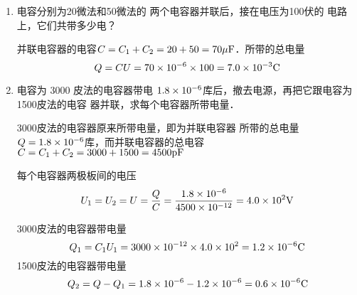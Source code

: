 \begin{enumerate}
\begin{figure}[htp]
    \caption{}
\end{figure}

\begin{proof}
    插入导体板后，相当于板间距离为$d_1$、$d_2$的两个平
    行板电容器串联。它们的电容分别为
    $C_1=\dfrac{S}{4\pi kd_1}$和 $C_2=\dfrac{S}{4\pi kd_2}$, 串联电容器的电容$C=\dfrac{C_1C_2}{C_1+C_2}$，将上式代入，得
    \[C=\frac{S}{4\pi k(d_1+d_2)}\]
    因为$d_1+d_2=\ell-d$, 所以$C=\dfrac{S}{4\pi k(\ell-d)}$.
\end{proof}

\item 电容分别为20微法和50微法的
两个电容器并联后，接在电压为100伏的
电路上，它们共带多少电？

\begin{solution}
    并联电容器的电容$C=C_1+C_2=20+50=
    70{\rm \mu F}$．所带的总电量
    \[Q=CU=70\times10^{-6}\times100=7.0\times  10^{-3}{\rm C}\]
\end{solution}

\item 电容为 3000 皮法的电容器带电
$1.8\times10^{-6}$库后，撤去电源，再把它跟电容为1500皮法的电容
器并联，求每个电容器所带电量．

\begin{solution}
    3000皮法的电容器原来所带电量，即为并联电容器
    所带的总电量$Q=1.8\times10^{-6}$库，而并联电容器的总电容$C=
    C_1+C_2=3000+1500=4500{\rm pF}$

    每个电容器两极板间的电压
    \[U_1=U_2=U=\frac{Q}{C}=\frac{1.8\times10^{-6}}{4500\times10^{-12}}=4.0\times 10^2{\rm V}\]
    
    3000皮法的电容器带电量
    \[Q_1=C_1U_1=3000\times10^{-12}\times4.0 \times10^2=1.2\times10^{-6}{\rm C}\]
    1500皮法的电容器带电量
    \[Q_2=Q-Q_1=1.8\times10^{-6}-1.2 \times10^{-6}=0.6\times10^{-6}{\rm C}\]
\end{solution}

\end{enumerate}





